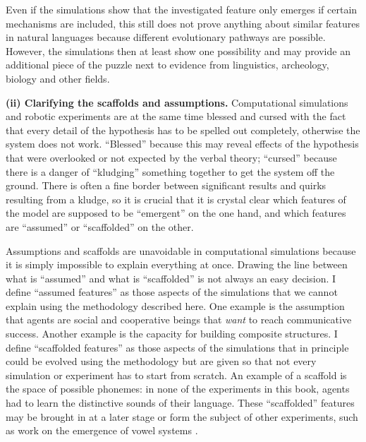 Even if the simulations show that the investigated feature only emerges if certain mechanisms are included, this still does not prove anything about similar features in natural languages because different evolutionary pathways are possible. However, the simulations then at least show one possibility and may provide an additional piece of the puzzle next to evidence from linguistics, archeology, biology and other fields.

{\bfseries (ii) Clarifying the scaffolds and assumptions.} Computational simulations and robotic experiments are at the same time blessed and cursed with the fact that every detail of the hypothesis has to be spelled out completely, otherwise the system does not work. ``Blessed'' because this may reveal effects of the hypothesis that were overlooked or not expected by the verbal theory; ``cursed'' because there is a danger of ``kludging'' something together to get the system off the ground. There is often a fine border between significant results and quirks resulting from a kludge, so it is crucial that it is crystal clear which features of the model are supposed to be ``emergent'' on the one hand, and which features are ``assumed'' or ``scaffolded'' on the other.

Assumptions and scaffolds are unavoidable in computational simulations because it is simply impossible to explain everything at once. Drawing the line between what is ``assumed'' and what is ``scaffolded'' is not always an easy decision. I define ``assumed features'' as those aspects of the simulations that we cannot explain using the methodology described here. One example is the assumption that agents are social and cooperative beings that {\em want} to reach communicative success. Another example is the capacity for building composite structures. I define ``scaffolded features'' as those aspects of the simulations that in principle could be evolved using the methodology but are given so that not every simulation or experiment has to start from scratch. An example of a scaffold is the space of possible phonemes: in none of the experiments in this book, agents had to learn the distinctive sounds of their language. These ``scaffolded'' features may be brought in at a later stage or form the subject of other experiments, such as work on the emergence of vowel systems \citep{deboer00self, oudeyer05self-organization}.

